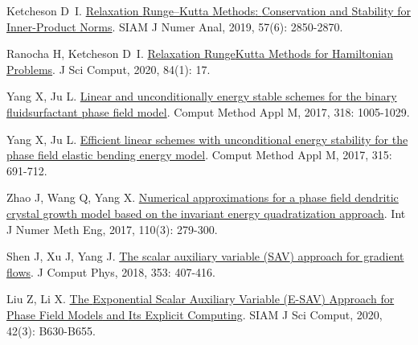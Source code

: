 \begin{thebibliography}{79}
    Ketcheson D~I.
    \newblock \href{https://epubs.siam.org/doi/abs/10.1137/19M1263662}{Relaxation {{Runge--Kutta Methods}}: {{Conservation}} and {{Stability}} for {{Inner-Product Norms}}}\allowbreak[J].
    \newblock SIAM J Numer Anal, 2019, 57\allowbreak (6): 2850-2870.
    
    Ranocha H, Ketcheson D~I.
    \newblock \href{https://link.springer.com/10.1007/s10915-020-01277-y}{Relaxation {{Runge}}{\textendash}{{Kutta Methods}} for {{Hamiltonian Problems}}}\allowbreak[J].
    \newblock J Sci Comput, 2020, 84\allowbreak (1): 17.
    
    Yang X, Ju L.
    \newblock \href{https://www.sciencedirect.com/science/article/pii/S0045782516317856}{Linear and unconditionally energy stable schemes for the binary fluid{\textendash}surfactant phase field model}\allowbreak[J].
    \newblock Comput Method Appl M, 2017, 318: 1005-1029.
    
    Yang X, Ju L.
    \newblock \href{https://www.sciencedirect.com/science/article/pii/S0045782516306016}{Efficient linear schemes with unconditional energy stability for the phase field elastic bending energy model}\allowbreak[J].
    \newblock Comput Method Appl M, 2017, 315: 691-712.
    
    Zhao J, Wang Q, Yang X.
    \newblock \href{https://onlinelibrary.wiley.com/doi/abs/10.1002/nme.5372}{Numerical approximations for a phase field dendritic crystal growth model based on the invariant energy quadratization approach}\allowbreak[J].
    \newblock Int J Numer Meth Eng, 2017, 110\allowbreak (3): 279-300.
    
    Shen J, Xu J, Yang J.
    \newblock \href{https://www.sciencedirect.com/science/article/pii/S002199911730774X}{The scalar auxiliary variable ({{SAV}}) approach for gradient flows}\allowbreak[J].
    \newblock J Comput Phys, 2018, 353: 407-416.
    
    Liu Z, Li X.
    \newblock \href{https://epubs.siam.org/doi/10.1137/19M1305914}{The {{Exponential Scalar Auxiliary Variable}} ({{E-SAV}}) {{Approach}} for {{Phase Field Models}} and {{Its Explicit Computing}}}\allowbreak[J].
    \newblock SIAM J Sci Comput, 2020, 42\allowbreak (3): B630-B655.
    

\end{thebibliography}
